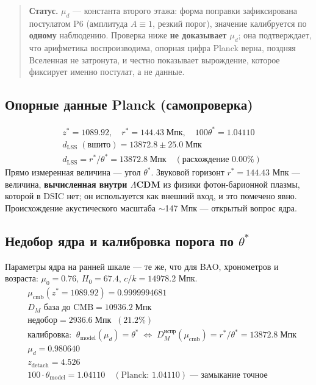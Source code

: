 \documentclass{article}
\begin{document}
\begin{quote}
\textbf{Статус.} $\mu_d$ --- константа второго этажа: форма поправки зафиксирована постулатом P6 (амплитуда $A \equiv 1$, резкий порог), значение калибруется по \textbf{одному} наблюдению. Проверка ниже \textbf{не доказывает} $\mu_d$; она подтверждает, что арифметика воспроизводима, опорная цифра Planck верна, поздняя Вселенная не затронута, и честно показывает вырождение, которое фиксирует именно постулат, а не данные.
\end{quote}

\subsection{Опорные данные Planck (самопроверка)}
\begin{align*}
&z^* = 1089.92,\quad r^* = 144.43\;\text{Мпк},\quad 100\theta^* = 1.04110 \\
&d_{\text{LSS}}\;(\text{вшито}) = 13872.8 \pm 25.0\;\text{Мпк} \\
&d_{\text{LSS}} = r^*/\theta^* = 13872.8\;\text{Мпк}\quad (\text{расхождение } 0.00\%)
\end{align*}
Прямо измеренная величина --- угол $\theta^*$. Звуковой горизонт $r^* = 144.43$ Мпк --- величина, \textbf{вычисленная внутри $\Lambda$CDM} из физики фотон-барионной плазмы, которой в DSIC нет; он используется как внешний вход, и это помечено явно. Происхождение акустического масштаба $\sim$147 Мпк --- открытый вопрос ядра.

\subsection{Недобор ядра и калибровка порога по $\theta^*$}

Параметры ядра на ранней шкале --- те же, что для BAO, хронометров и возраста: $\mu_0 = 0.76$, $H_0 = 67.4$, $c/k = 14978.2$ Мпк.
\begin{align*}
&\mu_{\text{cmb}}(z^* = 1089.92) = 0.9999994681 \\
&D_M \text{ база до CMB} = 10936.2\;\text{Мпк} \\
&\text{недобор} = 2936.6\;\text{Мпк}\;\;(21.2\%) \\[4pt]
&\text{калибровка:}\;\; \theta_{\text{model}}(\mu_d) = \theta^* \;\Leftrightarrow\; D_M^{\text{испр}}(\mu_{\text{cmb}}) = r^*/\theta^* = 13872.8\;\text{Мпк} \\
&\mu_d = 0.980640 \\
&z_{\text{detach}} = 4.526 \\
&100\cdot\theta_{\text{model}} = 1.04110 \quad (\text{Planck: } 1.04110)\;\text{--- замыкание точное}
\end{align*}
\end{document}
